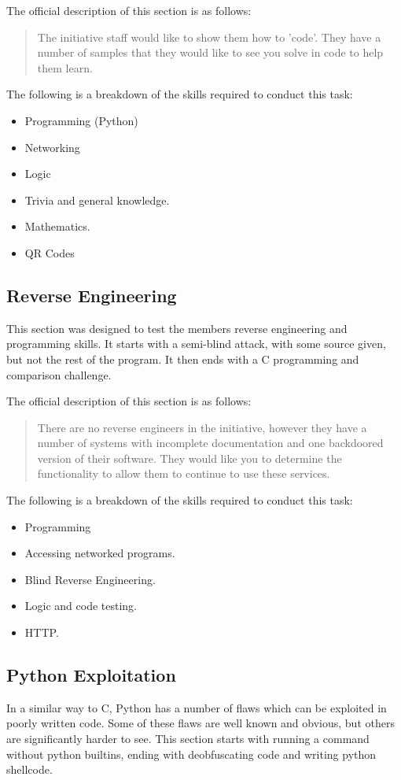 \documentclass[a4paper,11pt]{report}
\begin{document}
			The official description of this section is as follows:
			\begin{quote}
				The initiative staff would like to show them how to 'code'. They have a number of samples that they would like to see you solve in code to help them learn.
			\end{quote}

			The following is a breakdown of the skills required to conduct this task:
			\begin{itemize}
				\item Programming (Python)
				\item Networking
				\item Logic
				\item Trivia and general knowledge. 
				\item Mathematics. 
				\item QR Codes
			\end{itemize}

		\subsection{Reverse Engineering}
			This section was designed to test the members reverse engineering and programming skills. 
			It starts with a semi-blind attack, with some source given, but not the rest of the program. 
			It then ends with a C programming and comparison challenge. 
			
			The official description of this section is as follows:
			\begin{quote}
				There are no reverse engineers in the initiative, however they have a number of systems with incomplete documentation and one backdoored version of their software. They would like you to determine the functionality to allow them to continue to use these services.
			\end{quote}

			The following is a breakdown of the skills required to conduct this task:
			\begin{itemize}
				\item Programming
				\item Accessing networked programs. 
				\item Blind Reverse Engineering. 
				\item Logic and code testing. 
				\item HTTP. 
			\end{itemize}

		\subsection{Python Exploitation}
			In a similar way to C, Python has a number of flaws which can be exploited in poorly written code. 
			Some of these flaws are well known and obvious, but others are significantly harder to see. 
			This section starts with running a command without python builtins, ending with deobfuscating code and writing python shellcode. 
\end{document}
